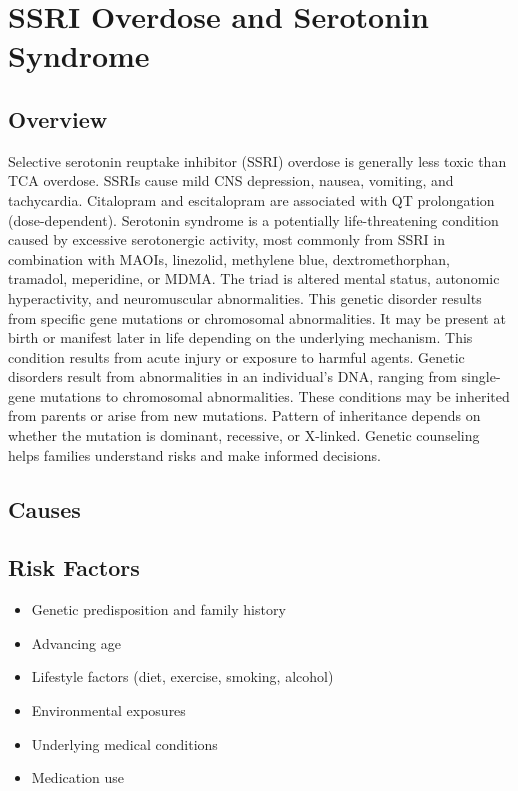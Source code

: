\chapter{SSRI Overdose and Serotonin Syndrome}
\label{sec:SSRI Overdose}

\section{Overview}
Selective serotonin reuptake inhibitor (SSRI) overdose is generally less toxic than TCA overdose. SSRIs cause mild CNS depression, nausea, vomiting, and tachycardia. Citalopram and escitalopram are associated with QT prolongation (dose-dependent). Serotonin syndrome is a potentially life-threatening condition caused by excessive serotonergic activity, most commonly from SSRI in combination with MAOIs, linezolid, methylene blue, dextromethorphan, tramadol, meperidine, or MDMA. The triad is altered mental status, autonomic hyperactivity, and neuromuscular abnormalities. This genetic disorder results from specific gene mutations or chromosomal abnormalities. It may be present at birth or manifest later in life depending on the underlying mechanism. This condition results from acute injury or exposure to harmful agents. Genetic disorders result from abnormalities in an individual's DNA, ranging from single-gene mutations to chromosomal abnormalities. These conditions may be inherited from parents or arise from new mutations. Pattern of inheritance depends on whether the mutation is dominant, recessive, or X-linked. Genetic counseling helps families understand risks and make informed decisions.
\section{Causes}
\section{Risk Factors}

\begin{itemize}[noitemsep]
  \item Genetic predisposition and family history
  \item Advancing age
  \item Lifestyle factors (diet, exercise, smoking, alcohol)
  \item Environmental exposures
  \item Underlying medical conditions
  \item Medication use
\end{itemize}
